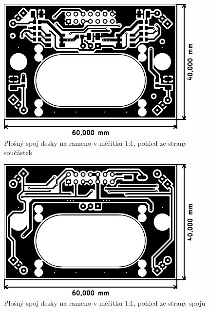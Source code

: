 \begin{figure}[h]
    \centering
    \includegraphics{pcb/shoulder-top}
    \caption{Plošný spoj desky na rameno v měřítku 1:1, pohled ze strany součástek}
\end{figure}
\begin{figure}[h]
    \centering
    \includegraphics{pcb/shoulder-bot}
    \caption{Plošný spoj desky na rameno v měřítku 1:1, pohled ze strany spojů}
\end{figure}

